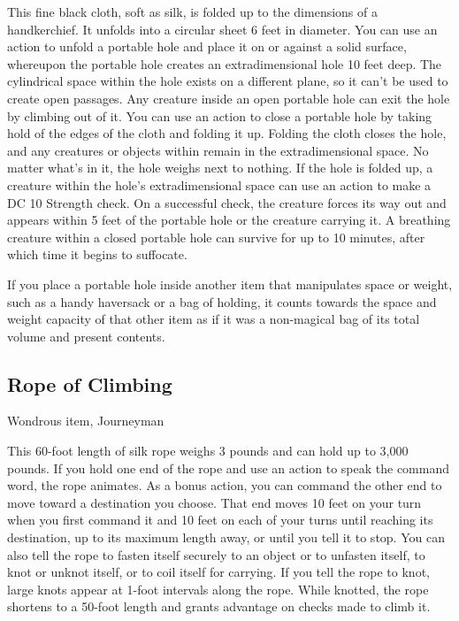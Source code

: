 This fine black cloth, soft as silk, is folded up to the dimensions of a handkerchief. It unfolds into a circular sheet 6 feet in diameter.  You can use an action to unfold a portable hole and place it on or against a solid surface, whereupon the portable hole creates an extradimensional hole 10 feet deep. The cylindrical space within the hole exists on a different plane, so it can't be used to create open passages. Any creature inside an open portable hole can exit the hole by climbing out of it.  You can use an action to close a portable hole by taking hold of the edges of the cloth and folding it up. Folding the cloth closes the hole, and any creatures or objects within remain in the extradimensional space. No matter what's in it, the hole weighs next to nothing.  If the hole is folded up, a creature within the hole's extradimensional space can use an action to make a DC 10 Strength check. On a successful check, the creature forces its way out and appears within 5 feet of the
portable hole or the creature carrying it. A breathing creature within a closed portable hole can survive for up to 10 minutes, after which time it begins to suffocate.

If you place a portable hole inside another item that manipulates space or weight, such as a handy haversack or a bag of holding, it counts towards the space and weight capacity of that other item as if it was a non-magical bag of its total volume and present contents.

\subsection{Rope of Climbing}
Wondrous item, Journeyman 

This 60-foot length of silk rope weighs 3 pounds and can hold up to 3,000 pounds. If you hold one end of the rope and use an action to speak the command word, the rope animates. As a bonus action, you can command the other end to move toward a destination you choose. That end moves 10 feet on your turn when you first command it and 10 feet on each of your turns until reaching its destination, up to its maximum length away, or until you tell it to stop. You can also tell the rope to fasten itself securely to an object or to unfasten itself, to knot or unknot itself, or to coil itself for carrying.  If you tell the rope to knot, large knots appear at 1-foot intervals along the rope. While knotted, the rope shortens to a 50-foot length and grants advantage on checks made to climb it.

